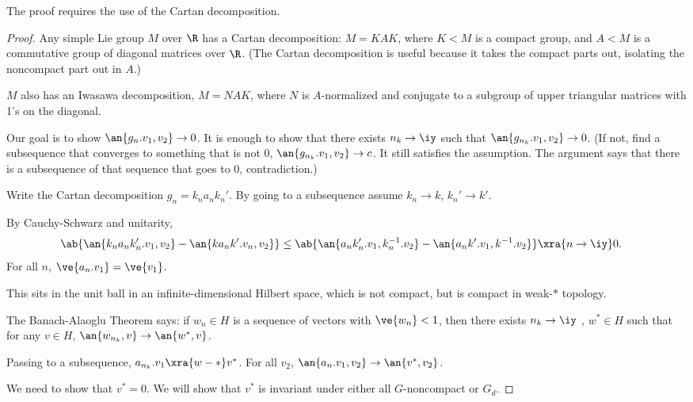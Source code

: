 The proof requires the use of the Cartan decomposition. 
\begin{proof}
Any simple %
Lie group $M$ over $\R$  has a Cartan decomposition: $M=KAK$, where $K<M$ is a compact group, and $A<M$ is a commutative group of diagonal matrices over $\R$.  (The Cartan decomposition is useful because it takes the compact parts out, isolating the noncompact part out in $A$.)

$M$ also has an Iwasawa decomposition, $M=NAK$, where $N$ is $A$-normalized and conjugate to a subgroup of upper triangular matrices with 1's on the diagonal. 

Our goal is to show $\an{g_n.v_1,v_2}\to 0$. It is enough to show that there exists $n_k\to \iy$ such that $\an{g_{n_k}.v_1,v_2}\to 0$. (If not, find a subsequence that converges to something that is not 0, $\an{g_{n_k}.v_1,v_2}\to c$. It still satisfies the assumption. The argument says that there is a subsequence of that sequence that goes to 0, contradiction.)

Write the Cartan decomposition $g_n=k_na_nk_n'$. By going to a subsequence assume $k_n\to k$, $k_n'\to k'$. 


By Cauchy-Schwarz and unitarity,
\begin{align}
\ab{
\an{k_na_nk_n'.v_1,v_2} - \an{ka_n k'.v_n,  v_2}
}
&\le \ab{
\an{a_n k_n'.v_1, k_n^{-1}.v_2} - \an{a_nk'.v_1, k^{-1}.v_2}
}
\xra{n\to \iy}0.
\end{align}
For all $n$, $\ve{a_n.v_1}=\ve{v_1}$. 

This sits in the unit ball in an infinite-dimensional Hilbert space, which is not compact, but is compact in weak-$*$ topology.

The Banach-Alaoglu Theorem says: if $w_n\in H$ is a sequence of vectors with $\ve{w_n}<1$,  then there exists $n_k\to \iy$ , $w^*\in H$ such that for any $v\in H$, $\an{w_{n_k},v}\to \an{w^*,v}$.

Passing to a subsequence, $a_{n_k} . v_1\xra{w-*} v^*$. For all $v_2$, $\an{a_n. v_1,v_2}\to \an{v^*, v_2}$. 

We need to show that $v^*=0$. We will show that $v^*$ is invariant under either all $G$-noncompact or $G_d$. 


\end{proof}
